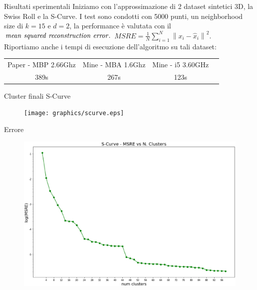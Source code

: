\documentclass[usenames,dvipsnames,9pt]{beamer}
\theoremstyle{definition}
\begin{document}
\begin{frame}{Risultati sperimentali}
Iniziamo con l'approssimazione di 2 dataset sintetici 3D, la Swiss Roll e la S-Curve. I test sono condotti con 5000 punti,
un neighborhood size di $k=15$ e $d=2$, la performance è valutata con il $\it{mean\ squared\ reconstruction\ error.}$
$M S R E=\frac{1}{N} \sum_{i=1}^{N}\left\|x_{i}-\hat{x}_{i}\right\|^{2}$. \\
Riportiamo anche i tempi di esecuzione dell'algoritmo su tali dataset:
\begin{center}
    \begin{tabular}{ |c|c|c|c| }
    \hline
    Paper - MBP 2.66Ghz & Mine - MBA 1.6Ghz & Mine - i5 3.60GHz \\
    389s & \color[HTML]{009901} 267s & \color[HTML]{009901} 123s \\
    \hline
    \end{tabular}
\end{center}
\end{frame}

\begin{frame}{Cluster finali S-Curve}
\begin{figure}[b]
\centering
\texttt{[image: graphics/scurve.eps]}
\end{figure}
\end{frame}

\begin{frame}{Errore}
\begin{figure}[b]
\centering
\includegraphics[width=\textwidth]{graphics/scurve_msre.eps}
\end{figure}
\end{frame}
\end{document}
